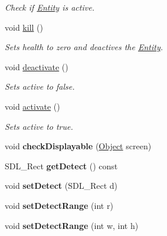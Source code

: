 \begin{DoxyCompactItemize}
\begin{DoxyCompactList}\small\item\em Check if \hyperlink{classEntity}{Entity} is active. \end{DoxyCompactList}\item 
void \hyperlink{classEntity_a522648b330daab91b49f78f0737a943f}{kill} ()\hypertarget{classEntity_a522648b330daab91b49f78f0737a943f}{}\label{classEntity_a522648b330daab91b49f78f0737a943f}

\begin{DoxyCompactList}\small\item\em Sets health to zero and deactives the \hyperlink{classEntity}{Entity}. \end{DoxyCompactList}\item 
void \hyperlink{classEntity_aa409e70e0f5abb2ac1314f8745b9a661}{deactivate} ()\hypertarget{classEntity_aa409e70e0f5abb2ac1314f8745b9a661}{}\label{classEntity_aa409e70e0f5abb2ac1314f8745b9a661}

\begin{DoxyCompactList}\small\item\em Sets active to false. \end{DoxyCompactList}\item 
void \hyperlink{classEntity_a95079be1c9fa9f109dd3cf7446eeeb1d}{activate} ()\hypertarget{classEntity_a95079be1c9fa9f109dd3cf7446eeeb1d}{}\label{classEntity_a95079be1c9fa9f109dd3cf7446eeeb1d}

\begin{DoxyCompactList}\small\item\em Sets active to true. \end{DoxyCompactList}\item 
void {\bfseries check\+Displayable} (\hyperlink{classObject}{Object} screen)\hypertarget{classEntity_a63aac9638f79f0608b08f28b8cdc718e}{}\label{classEntity_a63aac9638f79f0608b08f28b8cdc718e}

\item 
S\+D\+L\+\_\+\+Rect {\bfseries get\+Detect} () const \hypertarget{classEntity_a62073e91ee6f63f4b9a7e1512cda2e46}{}\label{classEntity_a62073e91ee6f63f4b9a7e1512cda2e46}

\item 
void {\bfseries set\+Detect} (S\+D\+L\+\_\+\+Rect d)\hypertarget{classEntity_a7624a9b21bbb1bd97d7f2eac20339a82}{}\label{classEntity_a7624a9b21bbb1bd97d7f2eac20339a82}

\item 
void {\bfseries set\+Detect\+Range} (int r)\hypertarget{classEntity_a884a7f8a537f3d0e926dfedb8e88a740}{}\label{classEntity_a884a7f8a537f3d0e926dfedb8e88a740}

\item 
void {\bfseries set\+Detect\+Range} (int w, int h)\hypertarget{classEntity_af4b91451301036e4aed029e90a7ba726}{}\label{classEntity_af4b91451301036e4aed029e90a7ba726}

\end{DoxyCompactItemize}
